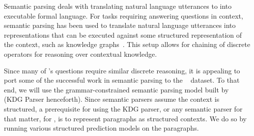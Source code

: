 
Semantic parsing deals with translating natural language utterances to
into executable formal language. For tasks requiring answering questions in context, semantic parsing
has been used to translate natural language utterances into representations that can be
executed against some structured representation of the context, such as knowledge
graphs~\citep[among others]{Zettlemoyer2005LearningTM,berant2013semantic,Yin2017ASN,chen2011learning}.
This setup allows for chaining of discrete operators for reasoning over contextual knowledge.

Since many of \drop's questions require similar discrete reasoning, it is appealing
to port some of the successful work in semantic parsing to the \drop~ dataset.
To that end, we will use the grammar-constrained semantic parsing model
built by~\cite{Krishnamurthy2017neuralsp} (KDG Parser henceforth). 
Since semantic parsers assume the context is structured, a prerequisite for using the
KDG parser, or any semantic parser for that matter,
for \drop, is to represent paragraphs as structured contexts. We do so by running various structured prediction models
on the paragraphs.

